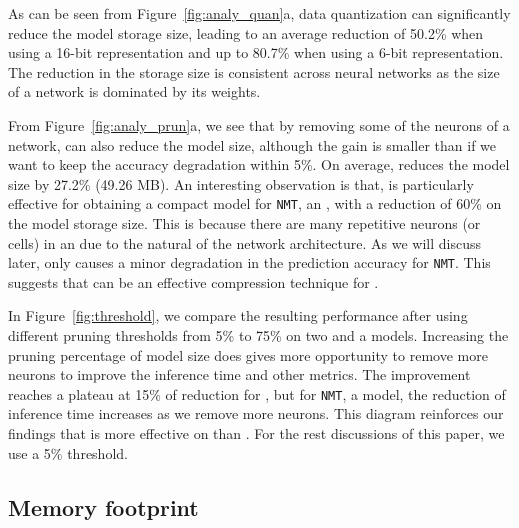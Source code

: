As can be seen from Figure~\ref{fig:analy_quan}a, data quantization can significantly reduce the model storage size, leading to an average
reduction of 50.2\% when using a 16-bit representation and up to 80.7\% when using a 6-bit representation. The reduction in the storage
size is consistent across neural networks as the size of a network is dominated by its weights.

From Figure~\ref{fig:analy_prun}a, we see that by removing some of the neurons of a network, \pruning can also reduce the model size,
although the gain is smaller than \quantization if we want to keep the accuracy degradation within 5\%. On average, \pruning reduces the
model size by 27.2\% (49.26 MB). An interesting observation is that, \pruning is particularly effective for obtaining a compact model for
\texttt{NMT}, an \RNN, with a reduction of 60\% on the model storage size. This is because there are many repetitive neurons (or cells) in
an \RNN due to the natural of the network architecture. As we will discuss later, \pruning only causes a minor degradation in the
prediction accuracy for \texttt{NMT}. This suggests that \pruning can be an effective compression technique for \RNNs.

In Figure~\ref{fig:threshold}, we compare the resulting performance after using different pruning thresholds from 5\% to 75\% on two \CNN and a \RNN
models. Increasing the pruning percentage of model size does gives \pruning more opportunity to remove more neurons to improve the inference
time and other metrics. The improvement reaches a plateau at 15\% of reduction for \CNNs, but for \texttt{NMT}, a \RNN model, the reduction of
inference time increases as we remove more neurons. This diagram reinforces our findings that \pruning is more effective on \RNNs
than \CNNs. For the rest discussions of this paper, we use a 5\% \pruning threshold.





\subsection{Memory footprint}

